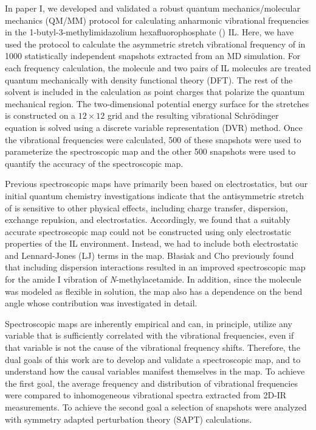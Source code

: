 \documentclass[%
  class = book,%
  crop = false,%
  float = true,%
  multi = true,%
  preview = false,%
]{standalone}
\let\cite\autocite
\begin{document}
In paper I\cite{Berquist2017}, we developed and validated a robust quantum mechanics/molecular mechanics (QM/MM) protocol for calculating anharmonic  vibrational frequencies in the 1-butyl-3-methylimidazolium hexafluorophosphate (\ce{[C4C1im][PF6]}) IL. Here, we have used the protocol to calculate the asymmetric stretch vibrational frequency of  in 1000 statistically independent snapshots extracted from an MD simulation. For each frequency calculation, the  molecule and two pairs of IL molecules are treated quantum mechanically with density functional theory (DFT). The rest of the solvent is included in the calculation as point charges that polarize the quantum mechanical region. The two-dimensional potential energy surface for the  stretches is constructed on a \(12 \times 12\) grid and the resulting vibrational Schrödinger equation is solved using a discrete variable representation (DVR) method. Once the vibrational frequencies were calculated, \num{500} of these snapshots were used to parameterize the spectroscopic map and the other \num{500} snapshots were used to quantify the accuracy of the spectroscopic map.

Previous spectroscopic maps have primarily been based on electrostatics,\cite{choi_vibrational_2011,corcelliJCP-04a,ohJCP-08,corcelliJPCA-05,schmidt_pronounced_2005-1,blasiak_vibrational_2013,Basiak2014} but our initial quantum chemistry investigations\cite{Brinzer2015,Berquist2017} indicate that the antisymmetric stretch of  is sensitive to other physical effects, including charge transfer, dispersion, exchange repulsion, and electrostatics. Accordingly, we found that a suitably accurate spectroscopic map could not be constructed using only electrostatic properties of the IL environment. Instead, we had to include both electrostatic and Lennard-Jones (LJ) terms in the map. B{\l{}}asiak and Cho previously found that including dispersion interactions resulted in an improved spectroscopic map for the amide I vibration of \textit{N}-methylacetamide.\cite{Basiak2015} In addition, since the  molecule was modeled as flexible in solution, the map also has a dependence on the  bend angle whose contribution was investigated in detail.

Spectroscopic maps are inherently empirical and can, in principle, utilize any variable that is sufficiently correlated with the vibrational frequencies, even if that variable is not the cause of the vibrational frequency shifts. Therefore, the dual goals of this work are to develop and validate a spectroscopic map, and to understand how the causal variables manifest themselves in the map. To achieve the first goal, the average frequency and distribution of vibrational frequencies were compared to inhomogeneous vibrational spectra extracted from 2D-IR measurements. To achieve the second goal a selection of snapshots were analyzed with symmetry adapted perturbation theory (SAPT)\cite{Jeziorski1994,Hohenstein2010,Hohenstein2011} calculations.
\end{document}
